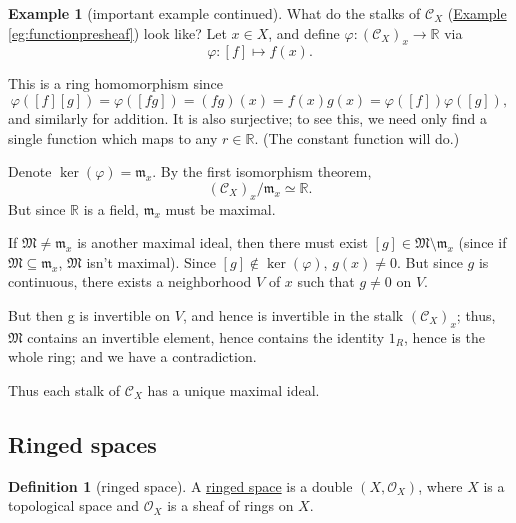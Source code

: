 \documentclass[a4paper]{report}
\newcommand{\R}{\mathbb{R}}
\newcommand{\defn}[1]{\ul{#1}}
\theoremstyle{definition}
\newtheorem{definition}{Definition}[section]
\newtheorem{example}{Example}[section]
\theoremstyle{plain}
\theoremstyle{remark}
\begin{document}
\begin{example}[important example continued]
  \label{eg:stalksofcx}
  What do the stalks of $\mathcal{C}_{X}$ (\hyperref[eg:functionpresheaf]{Example \ref*{eg:functionpresheaf}}) look like? Let $x \in X$, and define $\varphi\colon (\mathcal{C}_{X})_{x} \to \R$ via
  \begin{equation*}
    \varphi\colon [f] \mapsto f(x).
  \end{equation*}

  This is a ring homomorphism since
  \begin{equation*}
    \varphi([f][g]) = \varphi([fg]) = (fg)(x) = f(x)g(x) = \varphi([f])\varphi([g]),
  \end{equation*}
  and similarly for addition. It is also surjective; to see this, we need only find a single function which maps to any $r \in \R$. (The constant function will do.)

  Denote $\ker(\varphi) = \mathfrak{m}_{x}$. By the first isomorphism theorem,
  \begin{equation*}
    (\mathcal{C}_{X})_{x} / \mathfrak{m}_{x} \simeq \R.
  \end{equation*}
  But since $\R$ is a field, $\mathfrak{m}_{x}$ must be maximal. 

  If $\mathfrak{M} \neq \mathfrak{m}_{x}$ is another maximal ideal, then there must exist $[g] \in \mathfrak{M} \setminus \mathfrak{m}_{x}$ (since if $\mathfrak{M} \subseteq \mathfrak{m}_{x}$, $\mathfrak{M}$ isn't maximal). Since $[g] \notin \ker(\varphi)$, $g(x) \neq 0$. But since $g$ is continuous, there exists a neighborhood $V$ of $x$ such that $g \neq 0$ on $V$. 

  But then g is invertible on $V$, and hence is invertible in the stalk $(\mathcal{C}_{X})_{x}$; thus, $\mathfrak{M}$ contains an invertible element, hence contains the identity $1_{R}$, hence is the whole ring; and we have a contradiction.

  Thus each stalk of $\mathcal{C}_{X}$ has a unique maximal ideal.
\end{example}

\subsection{Ringed spaces}
\begin{definition}[ringed space] 
  \label{def:ringedspace} A \defn{ringed space} is a double $(X, \mathcal{O}_{X})$, where $X$ is a topological space and $\mathcal{O}_{X}$ is a sheaf of rings on $X$.
\end{definition}
\end{document}
